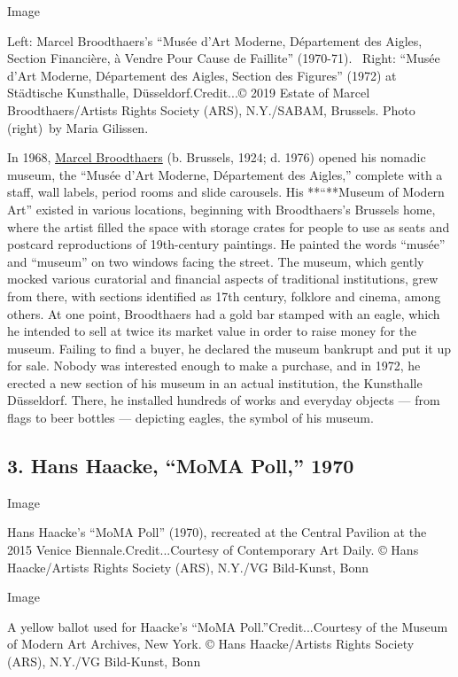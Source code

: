 Image

Left: Marcel Broodthaers's ``Musée d'Art Moderne, Département des
Aigles, Section Financière, à Vendre Pour Cause de Faillite''
(1970-71).~ Right: ``Musée d'Art Moderne, Département des Aigles,
Section des Figures'' (1972) at Städtische Kunsthalle,
Düsseldorf.Credit...© 2019 Estate of Marcel Broodthaers/Artists Rights
Society (ARS), N.Y./SABAM, Brussels. Photo (right)~by Maria Gilissen.

In 1968, \href{https://www.moma.org/collection/works/146915}{Marcel
Broodthaers} (b. Brussels, 1924; d. 1976) opened his nomadic museum, the
``Musée d'Art Moderne, Département des Aigles,'' complete with a staff,
wall labels, period rooms and slide carousels. His **``**Museum of
Modern Art'' existed in various locations, beginning with Broodthaers's
Brussels home, where the artist filled the space with storage crates for
people to use as seats and postcard reproductions of 19th-century
paintings. He painted the words ``musée'' and ``museum'' on two windows
facing the street. The museum, which gently mocked various curatorial
and financial aspects of traditional institutions, grew from there, with
sections identified as 17th century, folklore and cinema, among others.
At one point, Broodthaers had a gold bar stamped with an eagle, which he
intended to sell at twice its market value in order to raise money for
the museum. Failing to find a buyer, he declared the museum bankrupt and
put it up for sale. Nobody was interested enough to make a purchase, and
in 1972, he erected a new section of his museum in an actual
institution, the Kunsthalle Düsseldorf. There, he installed hundreds of
works and everyday objects --- from flags to beer bottles --- depicting
eagles, the symbol of his museum.

\hypertarget{3-hans-haacke-moma-poll-1970}{%
\subsection{3. Hans Haacke, ``MoMA Poll,''
1970}\label{3-hans-haacke-moma-poll-1970}}

Image

Hans Haacke's ``MoMA Poll'' (1970), recreated at the Central Pavilion at
the 2015 Venice Biennale.Credit...Courtesy of Contemporary Art Daily. ©
Hans Haacke/Artists Rights Society (ARS), N.Y./VG Bild-Kunst, Bonn

Image

A yellow ballot used for Haacke's ``MoMA Poll.''Credit...Courtesy of the
Museum of Modern Art Archives, New York. © Hans Haacke/Artists Rights
Society (ARS), N.Y./VG Bild-Kunst, Bonn

